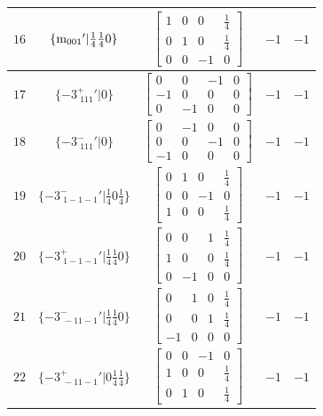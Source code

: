 \documentclass[fleqn,8pt]{jsarticle}
\begin{document}
\begin{longtable}{ccccc}
$ 16 $ & $ \{{\rm m}_{001}{}'|\frac{1}{4} \frac{1}{4} 0\} $ & $ \begin{bmatrix} 1 & 0 & 0 & \frac{1}{4} \\ 0 & 1 & 0 & \frac{1}{4} \\ 0 & 0 & -1 & 0 \end{bmatrix} $ & $ -1 $ & $ -1 $ \\ \hline
$ 17 $ & $ \{-3^{+}_{\,\,111}{}'|0\} $ & $ \begin{bmatrix} 0 & 0 & -1 & 0 \\ -1 & 0 & 0 & 0 \\ 0 & -1 & 0 & 0 \end{bmatrix} $ & $ -1 $ & $ -1 $ \\ \hline
$ 18 $ & $ \{-3^{-}_{\,\,111}{}'|0\} $ & $ \begin{bmatrix} 0 & -1 & 0 & 0 \\ 0 & 0 & -1 & 0 \\ -1 & 0 & 0 & 0 \end{bmatrix} $ & $ -1 $ & $ -1 $ \\ \hline
$ 19 $ & $ \{-3^{-}_{\,\,1-1-1}{}'|\frac{1}{4} 0 \frac{1}{4}\} $ & $ \begin{bmatrix} 0 & 1 & 0 & \frac{1}{4} \\ 0 & 0 & -1 & 0 \\ 1 & 0 & 0 & \frac{1}{4} \end{bmatrix} $ & $ -1 $ & $ -1 $ \\ \hline
$ 20 $ & $ \{-3^{+}_{\,\,1-1-1}{}'|\frac{1}{4} \frac{1}{4} 0\} $ & $ \begin{bmatrix} 0 & 0 & 1 & \frac{1}{4} \\ 1 & 0 & 0 & \frac{1}{4} \\ 0 & -1 & 0 & 0 \end{bmatrix} $ & $ -1 $ & $ -1 $ \\ \hline
$ 21 $ & $ \{-3^{-}_{\,\,-11-1}{}'|\frac{1}{4} \frac{1}{4} 0\} $ & $ \begin{bmatrix} 0 & 1 & 0 & \frac{1}{4} \\ 0 & 0 & 1 & \frac{1}{4} \\ -1 & 0 & 0 & 0 \end{bmatrix} $ & $ -1 $ & $ -1 $ \\ \hline
$ 22 $ & $ \{-3^{+}_{\,\,-11-1}{}'|0 \frac{1}{4} \frac{1}{4}\} $ & $ \begin{bmatrix} 0 & 0 & -1 & 0 \\ 1 & 0 & 0 & \frac{1}{4} \\ 0 & 1 & 0 & \frac{1}{4} \end{bmatrix} $ & $ -1 $ & $ -1 $ \\ \hline

\end{longtable}
\end{document}
